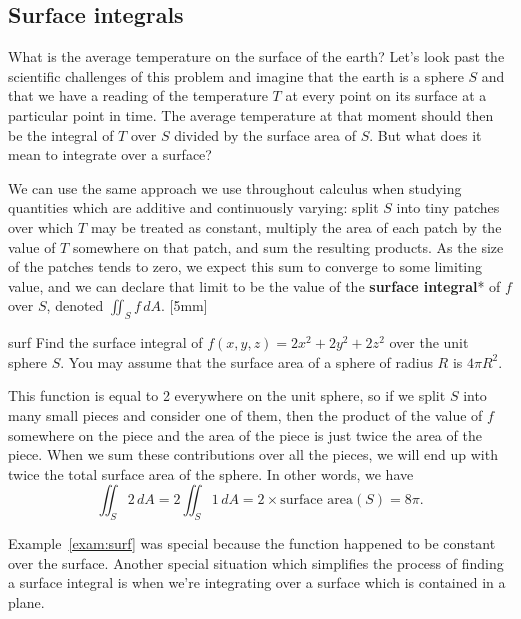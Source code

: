 \documentclass[indent]{watsonbook}
\begin{document}
\subsection{Surface integrals}


What is the average temperature on the surface of the earth? Let's
look past the scientific challenges of this problem and imagine that
the earth is a sphere $S$ and that we have a reading of the
temperature $T$ at every point on its surface at a particular point in
time. The average temperature at that moment should then be the
integral of $T$ over $S$ divided by the surface area of $S$. But what
does it mean to integrate over a surface?

We can use the same approach we use throughout calculus when studying
quantities which are additive and continuously varying: split $S$ into
tiny patches over which $T$ may be treated as constant, multiply the
area of each patch by the value of $T$ somewhere on that patch, and
sum the resulting products. As the size of the patches tends to zero,
we expect this sum to converge to some limiting value, and we can
declare that limit to be the value of the \textbf{surface integral}*
of $f$ over $S$, denoted $\iint_S f \, {{d}}A$. [5mm]

\begin{example}{}{surf}
  Find the surface integral of $f(x,y,z) = 2x^2 +2y^2 + 2z^2$ over the
  unit sphere $S$. You may assume that the surface area of a sphere of
  radius $R$ is $4\pi R^2$.
\end{example}

\begin{solution}
  This function is equal to 2 everywhere on the unit sphere, so if we
  split $S$ into many small pieces and consider one of them, then the
  product of the value of $f$ somewhere on the piece and the area of
  the piece is just twice the area of the piece. When we sum these
  contributions over all the pieces, we will end up with twice the
  total surface area of the sphere. In other words, we have
  \[
    \iint_{S} 2 \,{d} A =     2 \iint_{S} 1 \,{d} A = 2 \times \text{surface
      area}(S) = 8\pi.
  \]
\end{solution}

Example~\ref{exam:surf} was special because the function happened to
be constant over the surface. Another special situation which
simplifies the process of finding a surface integral is when
we're integrating over a surface which is contained in a plane.
\end{document}
